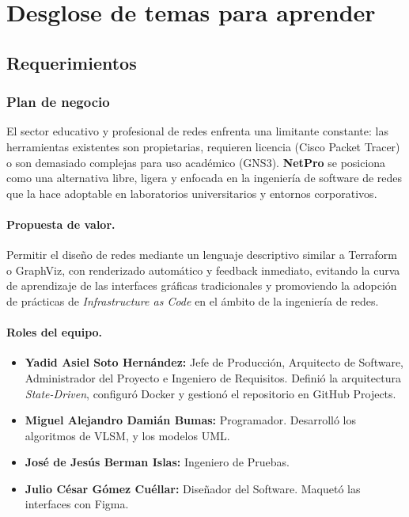 \documentclass[11pt,letterpaper,oneside]{article}
\begin{document}
\section{Desglose de temas para aprender}

\subsection{Requerimientos}

\subsubsection{Plan de negocio}

El sector educativo y profesional de redes enfrenta una limitante constante: las herramientas existentes son propietarias, requieren licencia (Cisco Packet Tracer) o son demasiado complejas para uso académico (GNS3). \textbf{NetPro} se posiciona como una alternativa libre, ligera y enfocada en la ingeniería de software de redes que la hace adoptable en laboratorios universitarios y entornos corporativos.

\paragraph{Propuesta de valor.} Permitir el diseño de redes mediante un lenguaje descriptivo similar a Terraform o GraphViz, con renderizado automático y feedback inmediato, evitando la curva de aprendizaje de las interfaces gráficas tradicionales y promoviendo la adopción de prácticas de \emph{Infrastructure as Code} en el ámbito de la ingeniería de redes.

\paragraph{Roles del equipo.}
\begin{itemize}[leftmargin=1.5em,itemsep=2pt]
  \item \textbf{Yadid Asiel Soto Hernández:} Jefe de Producción, Arquitecto de Software, Administrador del Proyecto e Ingeniero de Requisitos. Definió la arquitectura \emph{State-Driven}, configuró Docker y gestionó el repositorio en GitHub Projects.
  \item \textbf{Miguel Alejandro Damián Bumas:} Programador. Desarrolló los algoritmos de VLSM, y los modelos UML.
  \item \textbf{José de Jesús Berman Islas:} Ingeniero de Pruebas.
  \item \textbf{Julio César Gómez Cuéllar:} Diseñador del Software. Maquetó las interfaces con Figma.
\end{itemize}
\end{document}
